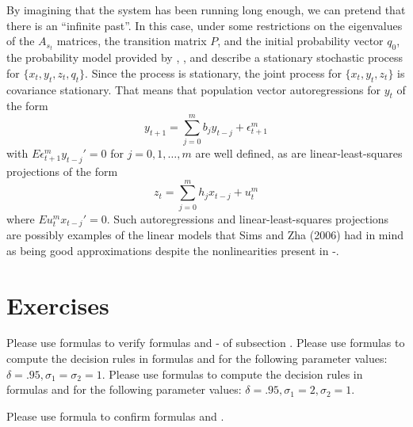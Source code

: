 By   imagining that the system has been running 
 long enough, we can pretend that there is  an ``infinite past''.  In this case, under some restrictions on the eigenvalues of the $A_{s_t}$ matrices, the transition matrix $P$, and the initial probability vector $q_0$, the probability model
provided by , , and   describe a  stationary stochastic process 
for   $\{x_t, y_t, z_t, q_t \}$.  Since the process is stationary, the joint process for $\{x_t, y_t, z_t\}$  is  covariance
stationary.  That means that population vector autoregressions for $y_t$ of the form
$$ y_{t+1} = \sum_{j=0}^m b_j y_{t-j} + \epsilon_{t+1}^m $$
with $E \epsilon_{t+1}^m y_{t-j}' =0 $ for $j =0, 1, \ldots, m$ are well defined, as are linear-least-squares 
projections of the form
$$ z_t = \sum_{j=0}^m h_j x_{t-j} + u_t^m $$
where $E u_t^m x_{t-j}' = 0$.  
Such autoregressions and  linear-least-squares projections are possibly examples of 
the linear models that Sims and Zha (2006) had  in mind as  being   good approximations despite 
the nonlinearities present in -. 


%
%




\showchaptIDfalse
\showsectIDfalse
\section{Exercises}
\showchaptIDtrue
\showsectIDtrue
{}

\medskip
{}  %
\medskip
{}  Please use formulas  to verify formulas  
and - of subsection .
\medskip
{} Please use formulas  to compute the decision rules
in formulas    and  for the following parameter values:
$\delta = .95, \sigma_1= \sigma_2 =1$.
\medskip
{}
 Please use formulas  to compute the decision rules
in formulas    and  for the following parameter values:
$\delta = .95, \sigma_1= 2,  \sigma_2 =1$.

\medskip
{} Please use formula  to confirm formulas
 and .\medskip


